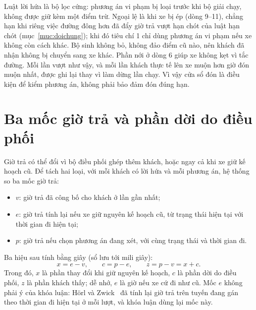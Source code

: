 
Luật lời hứa là bộ lọc cứng: phương án vi phạm bị loại trước khi bộ giải chạy, không được giữ kèm một điểm trừ.
Ngoại lệ là khi xe bị ép (dòng 9--11), chẳng hạn khi riêng việc đường đông hơn đã đẩy giờ trả vượt hạn chót của
luật hạn chót (mục~\ref{muc:doichung}); khi đó tiêu chí 1 chỉ dùng phương án vi phạm nếu xe không còn cách khác.
Bộ sinh không bỏ, không đảo điểm cũ nào, nên khách đã nhận không bị chuyển sang xe khác. Phần nới ở dòng 6 giúp
xe không kẹt vì tắc đường. Mỗi lần vượt như vậy, và mỗi lần khách thực tế lên xe muộn hơn giờ đón muộn nhất, được ghi
lại thay vì làm dừng lần chạy. Vì vậy cửa sổ đón là điều kiện để kiểm phương án, không phải bảo đảm đón đúng hạn.

\section{Ba mốc giờ trả và phần dời do điều phối}
\label{muc:bamoc}

Giờ trả có thể đổi vì bộ điều phối ghép thêm khách, hoặc ngay cả khi xe giữ kế hoạch cũ. Để tách hai loại, với
mỗi khách có lời hứa và mỗi phương án, hệ thống so ba mốc giờ trả:
\begin{itemize}[leftmargin=1.2cm,itemsep=2pt,topsep=3pt]
\item $v$: giờ trả đã công bố cho khách ở lần gần nhất;
\item $e$: giờ trả tính lại nếu xe giữ nguyên kế hoạch cũ, từ trạng thái hiện tại với thời gian đi hiện tại;
\item $p$: giờ trả nếu chọn phương án đang xét, với cùng trạng thái và thời gian đi.
\end{itemize}
Ba hiệu sau tính bằng giây (sổ lưu tới mili giây):
\begin{equation}
x = e - v, \qquad c = p - e, \qquad z = p - v = x + c .
\label{eq:bamoc}
\end{equation}
Trong đó, $x$ là phần thay đổi khi giữ nguyên kế hoạch, $c$ là phần dời do điều phối, $z$ là phần khách thấy;
dễ nhớ, $e$ là giờ nếu xe cứ đi như cũ. Mốc $e$ không phải ý của khóa luận: Hörl và Zwick~\cite{horl2022} đã tính
lại giờ trả trên tuyến đang gán theo thời gian đi hiện tại ở mỗi lượt, và khóa luận dùng lại mốc này.

